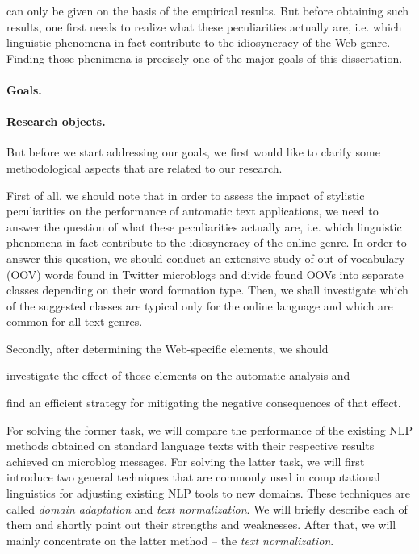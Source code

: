 can only be
given on the basis of the empirical results.  But before obtaining such
results, one first needs to realize what these peculiarities actually are,
i.e. which linguistic phenomena in fact contribute to the idiosyncracy of the
Web genre.  Finding those phenimena is precisely one of the major goals of
this dissertation.



\paragraph{Goals.}

\paragraph{Research objects.}

But before we start addressing our goals, we first would like to clarify some
methodological aspects that are related to our research.

First of all, we should note that in order to assess the impact of stylistic
peculiarities on the performance of automatic text applications, we need to
answer the question of what these peculiarities actually are, i.e. which
linguistic phenomena in fact contribute to the idiosyncracy of the online
genre.  In order to answer this question, we should conduct an extensive study
of out-of-vocabulary (OOV) words found in Twitter microblogs and divide found
OOVs into separate classes depending on their word formation type.  Then, we
shall investigate which of the suggested classes are typical only for the
online language and which are common for all text genres.

Secondly, after determining the Web-specific elements, we should
\begin{inparaenum}
\item investigate the effect of those elements on the automatic analysis and
\item find an efficient strategy for mitigating the negative consequences of
  that effect.
\end{inparaenum}
For solving the former task, we will compare the performance of the existing
NLP methods obtained on standard language texts with their respective results
achieved on microblog messages.  For solving the latter task, we will first
introduce two general techniques that are commonly used in computational
linguistics for adjusting existing NLP tools to new domains.  These techniques
are called \emph{domain adaptation} and \emph{text normalization}.  We will
briefly describe each of them and shortly point out their strengths and
weaknesses.  After that, we will mainly concentrate on the latter method --
the \emph{text normalization}.

